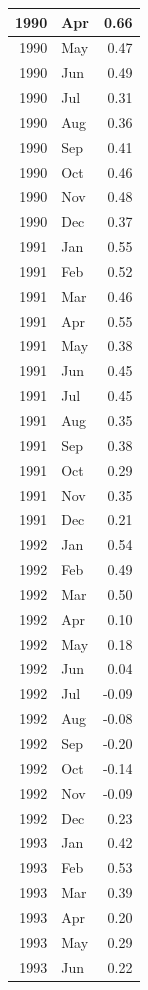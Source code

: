 \documentclass[
]{article}
\begin{document}
\begin{table}[H]
\begin{tabular}[t]{r|l|r}
\hline
1990 & Apr & 0.66\\
\hline
1990 & May & 0.47\\
\hline
1990 & Jun & 0.49\\
\hline
1990 & Jul & 0.31\\
\hline
1990 & Aug & 0.36\\
\hline
1990 & Sep & 0.41\\
\hline
1990 & Oct & 0.46\\
\hline
1990 & Nov & 0.48\\
\hline
1990 & Dec & 0.37\\
\hline
1991 & Jan & 0.55\\
\hline
1991 & Feb & 0.52\\
\hline
1991 & Mar & 0.46\\
\hline
1991 & Apr & 0.55\\
\hline
1991 & May & 0.38\\
\hline
1991 & Jun & 0.45\\
\hline
1991 & Jul & 0.45\\
\hline
1991 & Aug & 0.35\\
\hline
1991 & Sep & 0.38\\
\hline
1991 & Oct & 0.29\\
\hline
1991 & Nov & 0.35\\
\hline
1991 & Dec & 0.21\\
\hline
1992 & Jan & 0.54\\
\hline
1992 & Feb & 0.49\\
\hline
1992 & Mar & 0.50\\
\hline
1992 & Apr & 0.10\\
\hline
1992 & May & 0.18\\
\hline
1992 & Jun & 0.04\\
\hline
1992 & Jul & -0.09\\
\hline
1992 & Aug & -0.08\\
\hline
1992 & Sep & -0.20\\
\hline
1992 & Oct & -0.14\\
\hline
1992 & Nov & -0.09\\
\hline
1992 & Dec & 0.23\\
\hline
1993 & Jan & 0.42\\
\hline
1993 & Feb & 0.53\\
\hline
1993 & Mar & 0.39\\
\hline
1993 & Apr & 0.20\\
\hline
1993 & May & 0.29\\
\hline
1993 & Jun & 0.22\\

\end{tabular}
\end{table}
\end{document}
